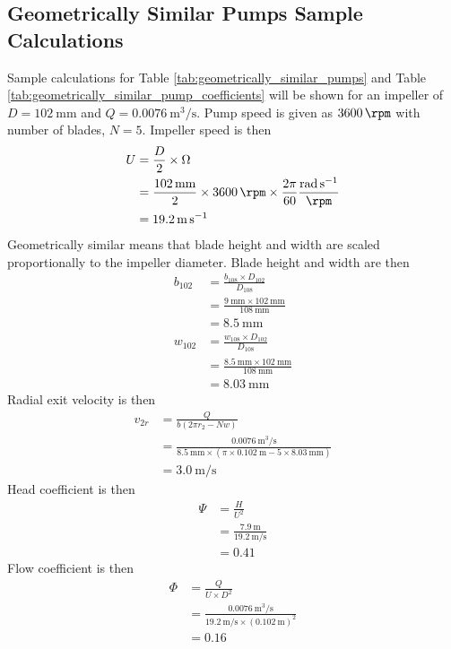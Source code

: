 \subsection{Geometrically Similar Pumps Sample Calculations}
Sample calculations for Table \ref{tab:geometrically_similar_pumps} and Table \ref{tab:geometrically_similar_pump_coefficients} will be shown for an impeller of $D = \qty{102}{\milli\meter}$ and $Q = \qty{0.0076}{\meter\cubed\per\second}$. Pump speed is given as $\qty{3600}{\rpm}$ with number of blades, $N = 5$. Impeller speed is then
\begin{align*}
    U &= \frac{D}{2} \times \Omega \\
    &= \frac{\qty{102}{\milli\meter}}{2} \times \qty{3600}{\rpm} \times \frac{2\pi}{60} \frac{\unit{\radian\per\second}}{\unit{\rpm}} \\
    &= \qty{19.2}{\meter\per\second}
\end{align*}
Geometrically similar means that blade height and width are scaled proportionally to the impeller diameter. Blade height and width are then
\begin{align*}
    b_{102} &= \frac{b_{108} \times D_{102}}{D_{108}} \\
    &= \frac{\qty{9}{\milli\meter} \times \qty{102}{\milli\meter}}{\qty{108}{\milli\meter}} \\
    &= \qty{8.5}{\milli\meter} \\
    w_{102} &= \frac{w_{108} \times D_{102}}{D_{108}} \\
    &= \frac{\qty{8.5}{\milli\meter} \times \qty{102}{\milli\meter}}{\qty{108}{\milli\meter}} \\
    &= \qty{8.03}{\milli\meter}
\end{align*}
Radial exit velocity is then
\begin{align*}
    v_{2r} &= \frac{Q}{b(2\pi r_2 - Nw)} \\
    &= \frac{\qty{0.0076}{\meter\cubed\per\second}}{\qty{8.5}{\milli\meter} \times (\pi \times \qty{0.102}{\meter} - 5 \times \qty{8.03}{\milli\meter})} \\
    &= \qty{3.0}{\meter\per\second}
\end{align*}
Head coefficient is then
\begin{align*}
    \Psi &= \frac{H}{U^2} \\
    &= \frac{\qty{7.9}{\meter}}{\qty{19.2}{\meter\per\second}} \\
    &= 0.41
\end{align*}
Flow coefficient is then
\begin{align*}
    \Phi &= \frac{Q}{U \times D^2} \\
    &= \frac{\qty{0.0076}{\meter\cubed\per\second}}{\qty{19.2}{\meter\per\second} \times (\qty{0.102}{\meter})^2} \\
    &= 0.16
\end{align*}

